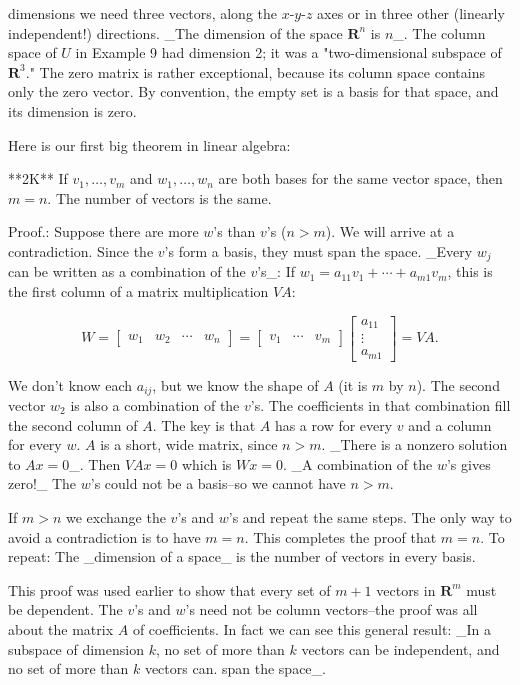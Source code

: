 dimensions we need three vectors, along the \(x\)-\(y\)-\(z\) axes or in three other (linearly independent!) directions. _The dimension of the space \(\mathbf{R}^{n}\) is \(n\)_. The column space of \(U\) in Example 9 had dimension 2; it was a "two-dimensional subspace of \(\mathbf{R}^{3}\)." The zero matrix is rather exceptional, because its column space contains only the zero vector. By convention, the empty set is a basis for that space, and its dimension is zero.

Here is our first big theorem in linear algebra:

**2K** If \(v_{1},\ldots,v_{m}\) and \(w_{1},\ldots,w_{n}\) are both bases for the same vector space, then \(m=n\). The number of vectors is the same.

Proof.: Suppose there are more \(w\)'s than \(v\)'s (\(n>m\)). We will arrive at a contradiction. Since the \(v\)'s form a basis, they must span the space. _Every \(w_{j}\) can be written as a combination of the \(v\)'s_: If \(w_{1}=a_{11}v_{1}+\cdots+a_{m1}v_{m}\), this is the first column of a matrix multiplication \(VA\):

\[W=\begin{bmatrix}w_{1}&w_{2}&\cdots&w_{n}\end{bmatrix}=\begin{bmatrix}v_{1}& \cdots&v_{m}\end{bmatrix}\begin{bmatrix}a_{11}\\ \vdots\\ a_{m1}\end{bmatrix}=VA.\]

We don't know each \(a_{ij}\), but we know the shape of \(A\) (it is \(m\) by \(n\)). The second vector \(w_{2}\) is also a combination of the \(v\)'s. The coefficients in that combination fill the second column of \(A\). The key is that \(A\) has a row for every \(v\) and a column for every \(w\). \(A\) is a short, wide matrix, since \(n>m\). _There is a nonzero solution to \(Ax=0\)_. Then \(VAx=0\) which is \(Wx=0\). _A combination of the \(w\)'s gives zero!_ The \(w\)'s could not be a basis--so we cannot have \(n>m\).

If \(m>n\) we exchange the \(v\)'s and \(w\)'s and repeat the same steps. The only way to avoid a contradiction is to have \(m=n\). This completes the proof that \(m=n\). To repeat: The _dimension of a space_ is the number of vectors in every basis. 

This proof was used earlier to show that every set of \(m+1\) vectors in \(\mathbf{R}^{m}\) must be dependent. The \(v\)'s and \(w\)'s need not be column vectors--the proof was all about the matrix \(A\) of coefficients. In fact we can see this general result: _In a subspace of dimension \(k\), no set of more than \(k\) vectors can be independent, and no set of more than \(k\) vectors can. span the space_.

